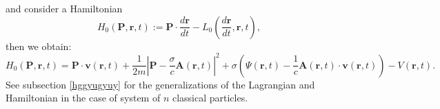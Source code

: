\documentclass{article}
\theoremstyle{definition}
\theoremstyle{remark}
\renewcommand{\vec}[1]{\mathbf{#1}}
\begin{document}
and consider a Hamiltonian
\begin{equation}\label{vhfffngghkjgghfjjhyjjfgint}
H_0\left(\vec P,\vec r,t\right):=\vec P\cdot\frac{d\vec
r}{dt}-L_0\left(\frac{d\vec r}{dt},\vec r,t\right),
\end{equation}
then we obtain:
\begin{equation}\label{vhfffngghkjgghfjjghghghint} H_0\left(\vec
P,\vec r,t\right)= \vec P\cdot\vec v(\vec r,t)+
\frac{1}{2m}\left|\vec P-\frac{\sigma}{c}\vec A(\vec
r,t)\right|^2+\sigma\left(\Psi(\vec r,t)-\frac{1}{c}\vec A(\vec
r,t)\cdot\vec v(\vec r,t)\right)-V\left(\vec r,t\right).
\end{equation}
See subsection \ref{hggyugyuy} for the generalizations of the
Lagrangian and Hamiltonian in the case of system of $n$ classical
particles.
\end{document}
